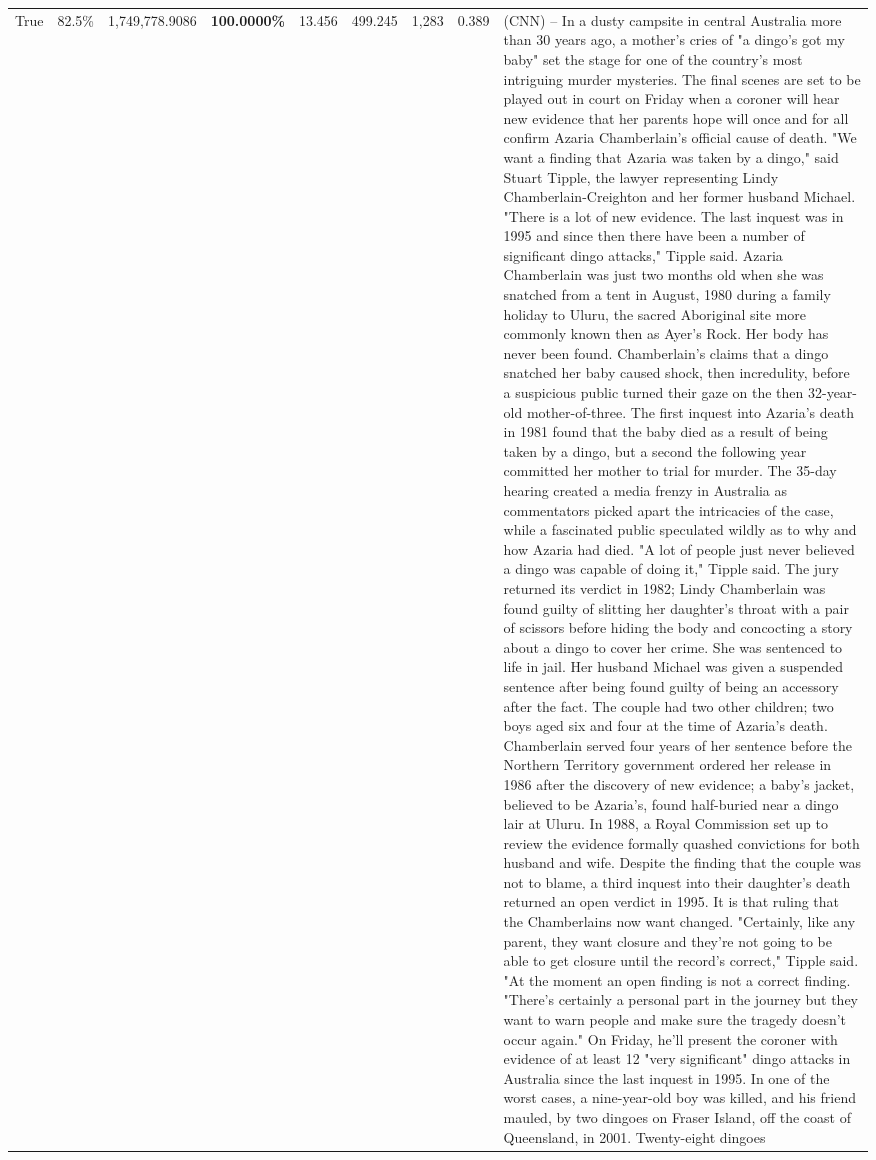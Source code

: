 \begin{table}[H]
\begin{tabular}{lllrlllll}
True & 82.5\% & 1,749,778.9086 & \bfseries \color{red} 100.0000\% & 13.456 & 499.245 & 1,283 & 0.389 & (CNN) -- In a dusty campsite in central Australia more than 30 years ago, a mother's cries of "a dingo's got my baby" set the stage for one of the country's most intriguing murder mysteries. The final scenes are set to be played out in court on Friday when a coroner will hear new evidence that her parents hope will once and for all confirm Azaria Chamberlain's official cause of death. "We want a finding that Azaria was taken by a dingo," said Stuart Tipple, the lawyer representing Lindy Chamberlain-Creighton and her former husband Michael. "There is a lot of new evidence. The last inquest was in 1995 and since then there have been a number of significant dingo attacks," Tipple said. Azaria Chamberlain was just two months old when she was snatched from a tent in August, 1980 during a family holiday to Uluru, the sacred Aboriginal site more commonly known then as Ayer's Rock. Her body has never been found. Chamberlain's claims that a dingo snatched her baby caused shock, then incredulity, before a suspicious public turned their gaze on the then 32-year-old mother-of-three. The first inquest into Azaria's death in 1981 found that the baby died as a result of being taken by a dingo, but a second the following year committed her mother to trial for murder. The 35-day hearing created a media frenzy in Australia as commentators picked apart the intricacies of the case, while a fascinated public speculated wildly as to why and how Azaria had died. "A lot of people just never believed a dingo was capable of doing it," Tipple said. The jury returned its verdict in 1982; Lindy Chamberlain was found guilty of slitting her daughter's throat with a pair of scissors before hiding the body and concocting a story about a dingo to cover her crime. She was sentenced to life in jail. Her husband Michael was given a suspended sentence after being found guilty of being an accessory after the fact. The couple had two other children; two boys aged six and four at the time of Azaria's death. Chamberlain served four years of her sentence before the Northern Territory government ordered her release in 1986 after the discovery of new evidence; a baby's jacket, believed to be Azaria's, found half-buried near a dingo lair at Uluru. In 1988, a Royal Commission set up to review the evidence formally quashed convictions for both husband and wife. Despite the finding that the couple was not to blame, a third inquest into their daughter's death returned an open verdict in 1995. It is that ruling that the Chamberlains now want changed. "Certainly, like any parent, they want closure and they're not going to be able to get closure until the record's correct," Tipple said. "At the moment an open finding is not a correct finding. "There's certainly a personal part in the journey but they want to warn people and make sure the tragedy doesn't occur again." On Friday, he'll present the coroner with evidence of at least 12 "very significant" dingo attacks in Australia since the last inquest in 1995. In one of the worst cases, a nine-year-old boy was killed, and his friend mauled, by two dingoes on Fraser Island, off the coast of Queensland, in 2001. Twenty-eight dingoes 
\end{tabular}
\end{table}
